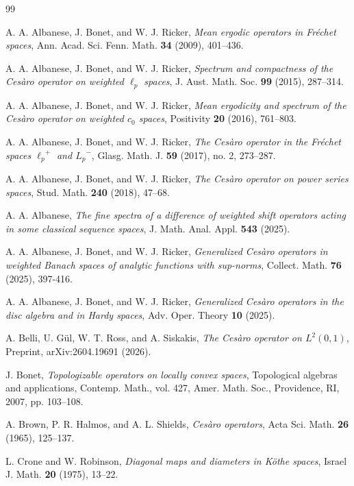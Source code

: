 \documentclass{birkjour}
\theoremstyle{definition}
\theoremstyle{remark}
\numberwithin{equation}{section}
\begin{document}
\begin{thebibliography}{99}

 A. A. Albanese, J. Bonet, and W. J. Ricker, \textit{Mean ergodic operators in Fréchet spaces}, Ann. Acad. Sci. Fenn. Math. \textbf{34} (2009), 401--436.

 A. A. Albanese, J. Bonet, and W. J. Ricker, \textit{Spectrum and compactness of the Ces\`{a}ro operator on weighted $\ell_{p}$ spaces}, J. Aust. Math. Soc. \textbf{99} (2015), 287--314.

 A. A. Albanese, J. Bonet, and W. J. Ricker, \textit{Mean ergodicity and spectrum of the Ces\`{a}ro operator on weighted $c_{0}$ spaces}, Positivity \textbf{20} (2016), 761--803.

 A. A. Albanese, J. Bonet, and W. J. Ricker, \textit{The Ces\`{a}ro operator in the Fr\'{e}chet spaces ${\ell_{p}}^{+}$ and ${L_{p}}^{-}$}, Glasg. Math. J. \textbf{59} (2017), no. 2, 273--287.

 A. A. Albanese, J. Bonet, and W. J. Ricker, \textit{The Ces\`{a}ro operator on power series spaces}, Stud. Math. \textbf{240} (2018), 47--68.

 A. A. Albanese, \textit{The fine spectra of a difference of weighted shift operators acting in some classical sequence spaces}, J. Math. Anal. Appl. \textbf{543} (2025).

 A. A. Albanese, J. Bonet, and W. J. Ricker, \textit{Generalized Ces\`{a}ro operators in weighted Banach spaces of analytic functions with sup-norms}, Collect. Math. \textbf{76} (2025), 397-416.

 A. A. Albanese, J. Bonet, and W. J. Ricker, \textit{Generalized Ces\`{a}ro operators in the disc algebra and in Hardy spaces}, Adv. Oper. Theory \textbf{10} (2025).

 A. Belli, U. G\"{u}l, W. T. Ross, and A. Siskakis, \textit{The Ces\`{a}ro operator on $L^{2}(0,1)$}, Preprint, arXiv:2604.19691 (2026).

 J. Bonet, \textit{Topologizable operators on locally convex spaces}, Topological algebras and applications, Contemp. Math., vol. 427, Amer. Math. Soc., Providence, RI, 2007, pp. 103--108.

 A. Brown, P. R. Halmos, and A. L. Shields, \textit{Ces\`{a}ro operators}, Acta Sci. Math. \textbf{26} (1965), 125--137.

 L. Crone and W. Robinson, \textit{Diagonal maps and diameters in K\"othe spaces}, Israel J. Math. \textbf{20} (1975), 13--22.


\end{thebibliography}
\end{document}
